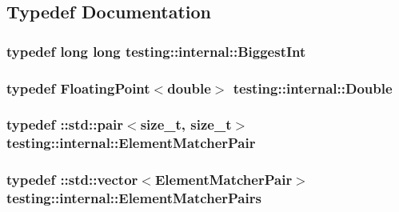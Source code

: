 \subsection{Typedef Documentation}
\subsubsection[{\texorpdfstring{Biggest\+Int}{BiggestInt}}]{\setlength{\rightskip}{0pt plus 5cm}typedef long long {\bf testing\+::internal\+::\+Biggest\+Int}}\hypertarget{namespacetesting_1_1internal_a05c6bd9ede5ccdf25191a590d610dcc6}{}\label{namespacetesting_1_1internal_a05c6bd9ede5ccdf25191a590d610dcc6}
\subsubsection[{\texorpdfstring{Double}{Double}}]{\setlength{\rightskip}{0pt plus 5cm}typedef {\bf Floating\+Point}$<$double$>$ {\bf testing\+::internal\+::\+Double}}\hypertarget{namespacetesting_1_1internal_a66a7579b1893b260c31dad577f7a5c48}{}\label{namespacetesting_1_1internal_a66a7579b1893b260c31dad577f7a5c48}
\subsubsection[{\texorpdfstring{Element\+Matcher\+Pair}{ElementMatcherPair}}]{\setlength{\rightskip}{0pt plus 5cm}typedef \+::std\+::pair$<$size\+\_\+t, size\+\_\+t$>$ {\bf testing\+::internal\+::\+Element\+Matcher\+Pair}}\hypertarget{namespacetesting_1_1internal_a109863545f08651178bf0f520aebd33b}{}\label{namespacetesting_1_1internal_a109863545f08651178bf0f520aebd33b}
\subsubsection[{\texorpdfstring{Element\+Matcher\+Pairs}{ElementMatcherPairs}}]{\setlength{\rightskip}{0pt plus 5cm}typedef \+::std\+::vector$<${\bf Element\+Matcher\+Pair}$>$ {\bf testing\+::internal\+::\+Element\+Matcher\+Pairs}}\hypertarget{namespacetesting_1_1internal_a0038618710c01a71150887dc7cfb0a29}{}\label{namespacetesting_1_1internal_a0038618710c01a71150887dc7cfb0a29}
